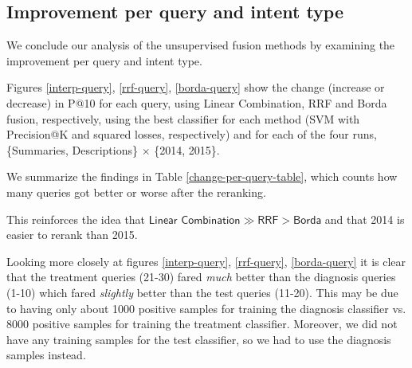 \subsection{Improvement per query and intent type}
We conclude our analysis of the unsupervised fusion methods by examining the improvement per query and intent type.

Figures \ref{interp-query}, \ref{rrf-query}, \ref{borda-query} show the change (increase or decrease) in P@10 for each query,
using Linear Combination, RRF and Borda fusion, respectively, using the best classifier for each method (SVM with
Precision@K and squared losses, respectively) and for each of the four runs, \{Summaries, Descriptions\} $\times$ \{2014, 2015\}.

We summarize the findings in Table \ref{change-per-query-table}, which counts
how many queries got better or worse after the reranking.

\begin{table}[h!]
\centering
\caption{Number of better/worse queries.}
\label{change-per-query-table}
\end{table}

This reinforces the idea that $\textsf{Linear Combination} \gg \textsf{RRF} > \textsf{Borda}$
and that 2014 is easier to rerank than 2015.

Looking more closely at figures \ref{interp-query}, \ref{rrf-query}, \ref{borda-query} 
it is clear that
the treatment queries (21-30) fared \emph{much} better than the diagnosis queries (1-10) 
which fared \emph{slightly} better than the test queries (11-20).
This may be due to having only about 1000 positive samples for training the diagnosis classifier vs. 8000 positive samples
for training the treatment classifier. Moreover, we did not have any training samples for the test classifier,
so we had to use the diagnosis samples instead.

